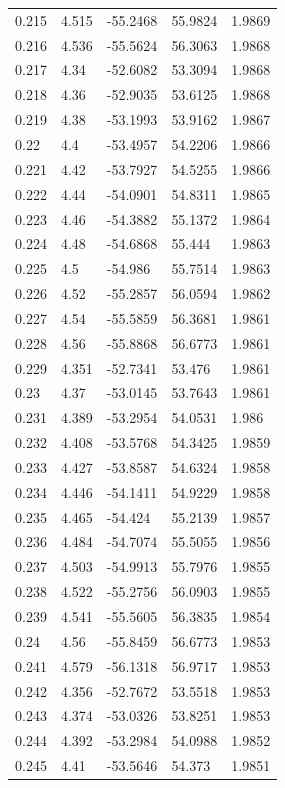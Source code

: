 \begin{tabular}{lllll}
0.215 & 4.515 & -55.2468 & 55.9824 & 1.9869 \\
0.216 & 4.536 & -55.5624 & 56.3063 & 1.9868 \\
0.217 & 4.34 & -52.6082 & 53.3094 & 1.9868 \\
0.218 & 4.36 & -52.9035 & 53.6125 & 1.9868 \\
0.219 & 4.38 & -53.1993 & 53.9162 & 1.9867 \\
0.22 & 4.4 & -53.4957 & 54.2206 & 1.9866 \\
0.221 & 4.42 & -53.7927 & 54.5255 & 1.9866 \\
0.222 & 4.44 & -54.0901 & 54.8311 & 1.9865 \\
0.223 & 4.46 & -54.3882 & 55.1372 & 1.9864 \\
0.224 & 4.48 & -54.6868 & 55.444 & 1.9863 \\
0.225 & 4.5 & -54.986 & 55.7514 & 1.9863 \\
0.226 & 4.52 & -55.2857 & 56.0594 & 1.9862 \\
0.227 & 4.54 & -55.5859 & 56.3681 & 1.9861 \\
0.228 & 4.56 & -55.8868 & 56.6773 & 1.9861 \\
0.229 & 4.351 & -52.7341 & 53.476 & 1.9861 \\
0.23 & 4.37 & -53.0145 & 53.7643 & 1.9861 \\
0.231 & 4.389 & -53.2954 & 54.0531 & 1.986 \\
0.232 & 4.408 & -53.5768 & 54.3425 & 1.9859 \\
0.233 & 4.427 & -53.8587 & 54.6324 & 1.9858 \\
0.234 & 4.446 & -54.1411 & 54.9229 & 1.9858 \\
0.235 & 4.465 & -54.424 & 55.2139 & 1.9857 \\
0.236 & 4.484 & -54.7074 & 55.5055 & 1.9856 \\
0.237 & 4.503 & -54.9913 & 55.7976 & 1.9855 \\
0.238 & 4.522 & -55.2756 & 56.0903 & 1.9855 \\
0.239 & 4.541 & -55.5605 & 56.3835 & 1.9854 \\
0.24 & 4.56 & -55.8459 & 56.6773 & 1.9853 \\
0.241 & 4.579 & -56.1318 & 56.9717 & 1.9853 \\
0.242 & 4.356 & -52.7672 & 53.5518 & 1.9853 \\
0.243 & 4.374 & -53.0326 & 53.8251 & 1.9853 \\
0.244 & 4.392 & -53.2984 & 54.0988 & 1.9852 \\
0.245 & 4.41 & -53.5646 & 54.373 & 1.9851 \\

\end{tabular}
